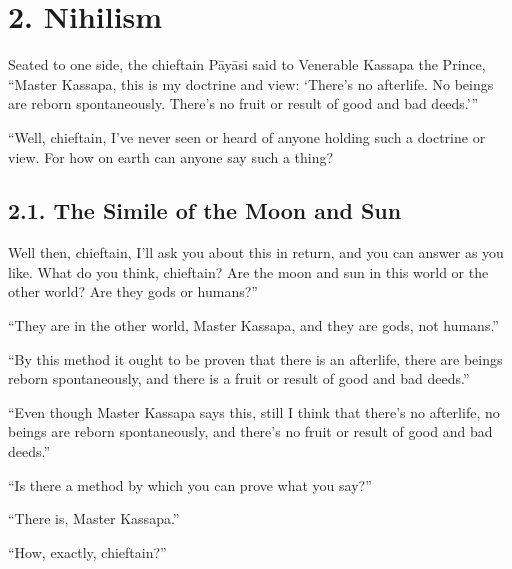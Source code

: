 \documentclass[12pt,openany]{book}%
\begin{document}
\section*{2. Nihilism }

Seated to one side, the chieftain \textsanskrit{Pāyāsi} said to Venerable Kassapa the Prince, “Master Kassapa, this is my doctrine and view: ‘There’s no afterlife. No beings are reborn spontaneously. There’s no fruit or result of good and bad deeds.’” 

“Well, chieftain, I’ve never seen or heard of anyone holding such a doctrine or view. For how on earth can anyone say such a thing? 

\subsection*{2.1. The Simile of the Moon and Sun }

Well then, chieftain, I’ll ask you about this in return, and you can answer as you like. What do you think, chieftain? Are the moon and sun in this world or the other world? Are they gods or humans?” 

“They are in the other world, Master Kassapa, and they are gods, not humans.” 

“By this method it ought to be proven that there is an afterlife, there are beings reborn spontaneously, and there is a fruit or result of good and bad deeds.” 

“Even though Master Kassapa says this, still I think that there’s no afterlife, no beings are reborn spontaneously, and there’s no fruit or result of good and bad deeds.” 

“Is there a method by which you can prove what you say?” 

“There is, Master Kassapa.” 

“How, exactly, chieftain?” 
\end{document}
